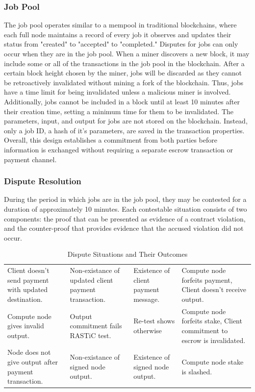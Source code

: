 \documentclass{article}
\begin{document}
\subsubsection{Job Pool}
The job pool operates similar to a mempool in traditional blockchains, where each full node maintains a record of every job it observes and updates their status from "created" to "accepted" to "completed."
 Disputes for jobs can only occur when they are in the job pool. 
 When a miner discovers a new block, it may include some or all of the transactions in the job pool in the blockchain. 
 After a certain block height chosen by the miner, jobs will be discarded as they cannot be retroactively invalidated without mining a fork of the blockchain. 
 Thus, jobs have a time limit for being invalidated unless a malicious miner is involved. 
 Additionally, jobs cannot be included in a block until at least 10 minutes after their creation time, setting a minimum time for them to be invalidated. 
 The parameters, input, and output for jobs are not stored on the blockchain. Instead, only a job ID, a hash of it's parameters, are saved in the transaction properties. 
 Overall, this design establishes a commitment from both parties before information is exchanged without requiring a separate escrow transaction or payment channel.
\subsubsection{Dispute Resolution}
During the period in which jobs are in the job pool, they may be contested for a duration of approximately 10 minutes. 
Each contestable situation consists of two components: the proof that can be presented as evidence of a contract violation, and the counter-proof that provides evidence that the accused violation did not occur.
\setlength{\extrarowheight}{2pt}
\begin{table}[H]
\caption{Dispute Situations and Their Outcomes}
\begin{tabular}{|>{\raggedright\arraybackslash}p{2.75cm}|>{\raggedright\arraybackslash}p{2.75cm}|>{\raggedright\arraybackslash}p{2.75cm}|>{\raggedright\arraybackslash}p{2.75cm}|}
    \hline
    \multicolumn{1}{|c|}{\textbf{Claim}} & \multicolumn{1}{c|}{\textbf{Proof}} & \multicolumn{1}{c|}{\textbf{Counter}} & \multicolumn{1}{c|}{\textbf{Result}} \\
    \hline
    Client doesn't send payment with updated destination. & Non-existance of updated client payment transaction. & Existence of client payment message. & Compute node forfeits payment, Client doesn't receive output. \\
    \hline
    Compute node gives invalid output. & Output commitment fails RASTiC test. & Re-test shows otherwise & Compute node forfeits stake, Client commitment to escrow is invalidated. \\
    \hline
    Node does not give output after payment transaction. & Non-existance of signed node output. & Existence of signed node output. & Compute node stake is slashed. \\
    \hline
\end{tabular}
\end{table}
  
\end{document}
